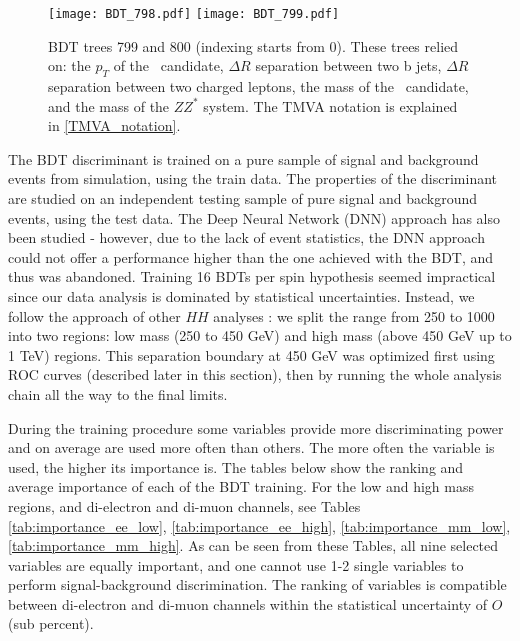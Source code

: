 \begin{figure}[H]
\begin{center}
\texttt{[image: BDT\_798.pdf]}
\texttt{[image: BDT\_799.pdf]}\\
\caption[BDT trees 799 and 800.]{BDT trees 799 and 800 (indexing starts from 0). These trees relied on: the $p_T$ of the \Zll~candidate, 
$\Delta R$ separation between two b jets,
$\Delta R$ separation between two charged leptons, 
the mass of the \HBB~candidate, and the mass of the $ZZ^*$ system. The TMVA notation is explained in \ref{TMVA_notation}.} 
\label{fig:bdt_trees_3}
\end{center}
\end{figure}

The BDT discriminant is trained on a pure sample of signal and background events from simulation, using the train data. The properties of the discriminant are studied on an independent testing sample of pure signal and background events, using the test data. The Deep Neural Network (DNN) approach has also been studied - however, due to the lack of event statistics, the DNN approach could not offer a performance higher than the one achieved with the BDT, and thus was abandoned. Training 16 BDTs per spin hypothesis seemed impractical since our data analysis is dominated by statistical uncertainties. Instead, we follow the approach of other $HH$ analyses \cite{HH_combination}: we split the range from 250 to 1000 into two regions: low mass (250 to 450 GeV) and high mass (above 450 GeV up to 1 TeV) regions. This separation boundary at 450 GeV was optimized first using ROC curves (described later in this section), then by running the whole analysis chain all the way to the final limits. %

During the training procedure some variables provide more discriminating power and on average are used more often than others. The more often the variable is used, the higher its importance is. The tables below show the ranking and average importance of each of the BDT training. For the low and high mass regions, and di-electron and di-muon channels, see Tables \ref{tab:importance_ee_low}, \ref{tab:importance_ee_high}, \ref{tab:importance_mm_low}, \ref{tab:importance_mm_high}. As can be seen from these Tables, all nine selected variables are equally important, and one cannot use 1-2 single variables to perform signal-background discrimination. The ranking of variables is compatible between di-electron and di-muon channels within the statistical uncertainty of $O$(sub percent). 

